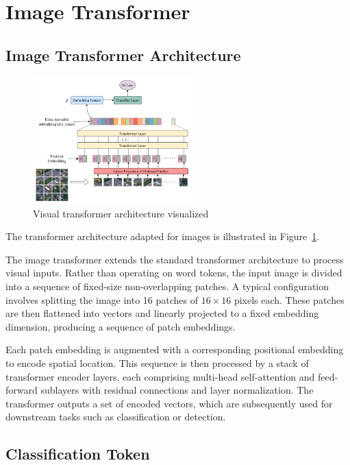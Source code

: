 \documentclass{pracalicmgr}
\begin{document}
\section{Image Transformer}

\subsection{Image Transformer Architecture}

\begin{figure}[h]
    \centering
    \includegraphics[width=0.55\textwidth]{src/visNet.pdf}
    \caption{Visual transformer architecture visualized}
    \label{fig:visNetArch}
\end{figure}

The transformer architecture adapted for images is illustrated in Figure~\ref{fig:visNetArch}.


The image transformer extends the standard transformer architecture to process visual inputs. Rather than operating on word tokens, the input image is divided into a sequence of fixed-size non-overlapping patches. A typical configuration involves splitting the image into 16 patches of \(16 \times 16\) pixels each. These patches are then flattened into vectors and linearly projected to a fixed embedding dimension, producing a sequence of patch embeddings.

Each patch embedding is augmented with a corresponding positional embedding to encode spatial location. This sequence is then processed by a stack of transformer encoder layers, each comprising multi-head self-attention and feed-forward sublayers with residual connections and layer normalization. The transformer outputs a set of encoded vectors, which are subsequently used for downstream tasks such as classification or detection.

\subsection{Classification Token}
\end{document}
